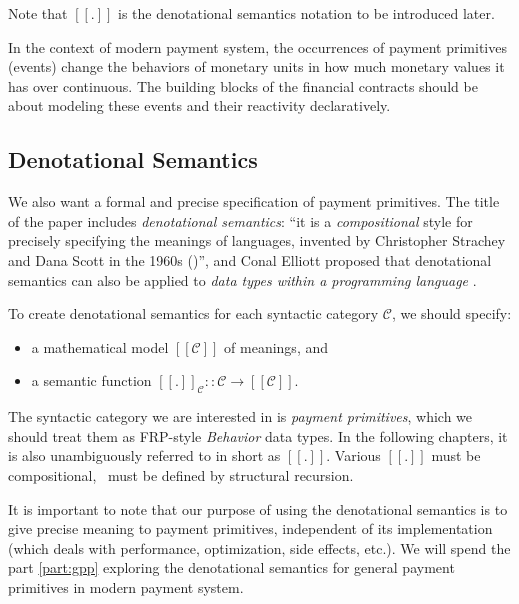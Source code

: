 Note that $[\![.]\!]$ is the denotational semantics notation to be introduced later.

In the context of modern payment system, the occurrences of payment primitives (events) change the
behaviors of monetary units in how much monetary values it has over continuous. The building blocks
of the financial contracts should be about modeling these events and their reactivity declaratively.

\subsection{Denotational Semantics}

We also want a formal and precise specification of payment primitives. The title of the paper
includes \textit{denotational semantics}: ``it is a \textit{compositional} style for precisely
specifying the meanings of languages, invented by Christopher Strachey and Dana Scott in the 1960s
(\cite{scott1971toward})'', and Conal Elliott proposed that denotational semantics can also be
applied to \textit{data types within a programming language}
.

To create denotational semantics for each syntactic category $\mathcal{C}$, we should specify:

\begin{itemize}
\item a mathematical model $[\![\mathcal{C}]\!]$ of meanings, and
\item a semantic function $[\![.]\!]_{\mathcal{C}} :: \mathcal{C} \rightarrow [\![\mathcal{C}]\!]$.
\end{itemize}

The syntactic category we are interested in is \textit{payment primitives}, which we should treat
them as FRP-style \textit{Behavior} data types. In the following chapters, it is also unambiguously
referred to in short as $[\![.]\!]$. Various $[\![.]\!]$ must be compositional, \ie\ must be defined
by structural recursion.

It is important to note that our purpose of using the denotational semantics is to give precise
meaning to payment primitives, independent of its implementation (which deals with performance,
optimization, side effects, etc.). We will spend the part \ref{part:gpp} exploring the denotational
semantics for general payment primitives in modern payment system.

